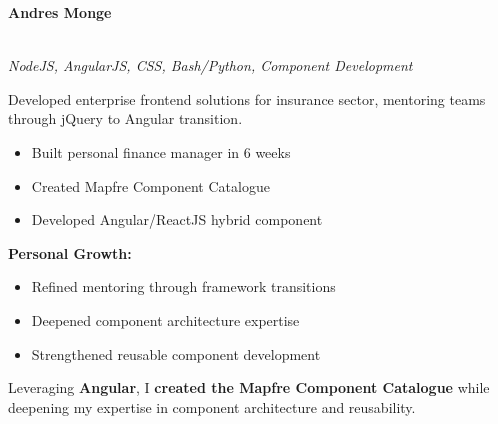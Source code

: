 \documentclass[a4paper,10pt]{article}
\newcommand{\experiencebreak}{\needspace{18\baselineskip}}
\begin{document}
\newpage
\noindent
{}\hfill
{\large\bfseries\color{blue}\selectfont
	A\color{lightblue}ndr\color{blue}e\color{lightblue}s \color{blue}Monge}
\vspace{0.3cm}

\experiencebreak
\noindent\uline{} \\
\vspace{0.1cm} \hspace{0.2cm}
{\small\textit{NodeJS, AngularJS, CSS, Bash/Python, Component Development}}

Developed enterprise frontend solutions for insurance sector, mentoring teams through jQuery to Angular transition.

\vspace{0.2cm}
\begin{itemize}[label=\textcolor{darkblue}{\textbullet}, leftmargin=*, nosep]
	\item Built personal finance manager in 6 weeks
	\item Created Mapfre Component Catalogue
	\item Developed Angular/ReactJS hybrid component
\end{itemize}

\vspace{0.2cm}
\textbf{Personal Growth:}
\vspace{0.2cm}
\begin{itemize}[label=\textcolor{darkblue}{\textbullet}, leftmargin=*, nosep]
	\item Refined mentoring through framework transitions
	\item Deepened component architecture expertise
	\item Strengthened reusable component development
\end{itemize}

\vspace{0.2cm}

Leveraging \textbf{Angular}, I \textbf{created the Mapfre Component Catalogue} while deepening my expertise in component architecture and reusability.



\nopagebreak

\noindent
\vspace{0.4cm}
\end{document}
